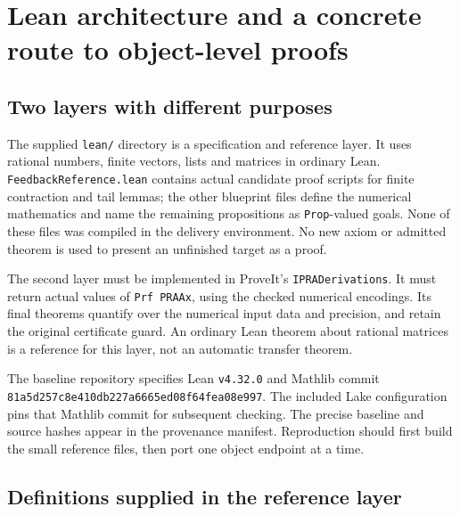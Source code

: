 \section{Lean architecture and a concrete route to object-level proofs}\label{sec:lean}

\subsection{Two layers with different purposes}

The supplied \texttt{lean/} directory is a specification and reference layer. It uses rational numbers, finite vectors, lists and matrices in ordinary Lean. \nolinkurl{FeedbackReference.lean} contains actual candidate proof scripts for finite contraction and tail lemmas; the other blueprint files define the numerical mathematics and name the remaining propositions as \texttt{Prop}-valued goals. None of these files was compiled in the delivery environment. No new axiom or admitted theorem is used to present an unfinished target as a proof.

The second layer must be implemented in ProveIt's \nolinkurl{IPRADerivations}. It must return actual values of \texttt{Prf PRAAx}, using the checked numerical encodings. Its final theorems quantify over the numerical input data and precision, and retain the original certificate guard. An ordinary Lean theorem about rational matrices is a reference for this layer, not an automatic transfer theorem.

The baseline repository specifies Lean \texttt{v4.32.0} and Mathlib commit
\nolinkurl{81a5d257c8e410db227a6665ed08f64fea08e997}. The included Lake configuration pins that Mathlib commit for subsequent checking. The precise baseline and source hashes appear in the provenance manifest. Reproduction should first build the small reference files, then port one object endpoint at a time.

\subsection{Definitions supplied in the reference layer}

